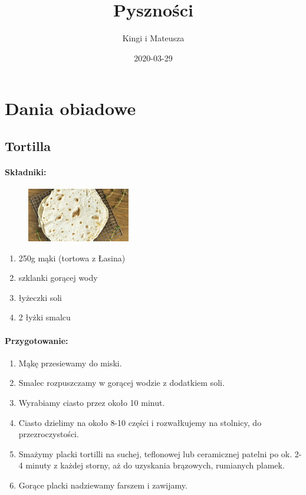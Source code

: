 \documentclass{article}
\title{Pyszności}
\author{Kingi i Mateusza}
\date{2020-03-29}
\begin{document}
    \maketitle
    \newpage
    \tableofcontents
    \newpage

    \section{Dania obiadowe}
    \medskip
    \subsection{Tortilla}
    \bigskip
    \paragraph{Składniki:}
    \begin{figure}
        \includegraphics[width=0.4\textwidth]{tortilla.jpg}
    \end{figure}
    \begin{enumerate}
        \item 250g mąki (tortowa z Łasina)
        \item {} szklanki gorącej wody
        \item {} łyżeczki soli
        \item 2 łyżki smalcu
    \end{enumerate}

    \paragraph{Przygotowanie:}
    \begin{enumerate}
        \item Mąkę przesiewamy do miski.
        \item Smalec rozpuszczamy w gorącej wodzie z dodatkiem soli.
        \item Wyrabiamy ciasto przez około 10 minut.
        \item Ciasto dzielimy na około 8-10 części i rozwałkujemy na stolnicy,
            do przezroczystości.
        \item Smażymy placki tortilli na suchej, teflonowej lub ceramicznej
            patelni po ok. 2-4 minuty z każdej storny, aż do uzyskania
            brązowych, rumianych plamek.
        \item Gorące placki nadziewamy farszem i zawijamy.
    \end{enumerate}
\end{document}
